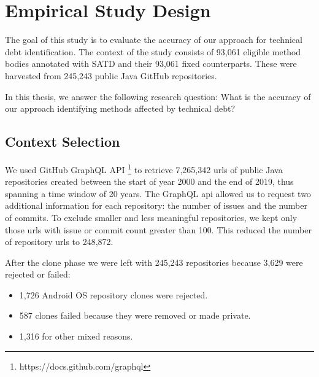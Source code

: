 \chapter{Empirical Study Design}


%



The goal of this study is to evaluate the accuracy of our approach for technical debt identification.
The context of the study consists of 93,061 eligible method bodies annotated with SATD and their 93,061 fixed counterparts. These were harvested from 245,243 public Java GitHub repositories. 

In this thesis, we answer the following research question:
What is the accuracy of our approach identifying methods affected by technical debt?


\section{Context Selection}

We used GitHub GraphQL API \footnote{https://docs.github.com/graphql} to retrieve 7,265,342 urls of public Java repositories created between the start of year 2000 and the end of 2019, thus spanning a time window of 20 years.
The GraphQL api allowed us to request two additional information for each repository: the number of issues and the number of commits. To exclude smaller and less meaningful repositories, we kept only those urls with issue or commit count greater than 100. This reduced the number of repository urls to 248,872.

After the clone phase we were left with 245,243 repositories because 3,629 were rejected or failed:
\begin{itemize}
    \item 1,726 Android OS repository clones were rejected.
    \item 587 clones failed because they were removed or made private.
    \item 1,316 for other mixed reasons.
\end{itemize}



